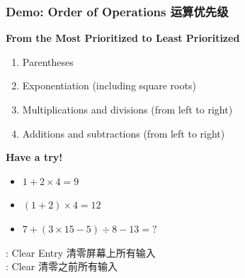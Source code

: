 \documentclass[
	11pt, %
]{beamer}
\begin{document}

\begin{frame}
	\frametitle{Demo: Order of Operations 运算优先级}
		\textbf{From the Most Prioritized to Least Prioritized}
		\begin{enumerate}
			\item Parentheses
			\item Exponentiation (including square roots)
			\item Multiplications and divisions (from left to right)
			\item Additions and subtractions (from left to right)
		\end{enumerate}

		\bigskip
	    \textbf{Have a try!}\\
			\begin{itemize}
				\item $1 + 2 \times 4 = 9$   
				\item $(1 + 2) \times 4 = 12$
				\item $7 + (3 \times 15 - 5) \div 8 - 13 = ?$
			\end{itemize}
			\bigskip
		: Clear Entry 清零屏幕上所有输入  \\
		: Clear 清零之前所有输入
\end{frame}

\end{document}

